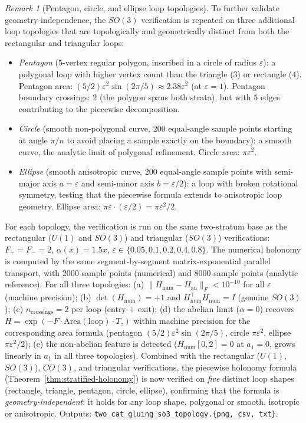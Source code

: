 \documentclass[11pt,a4paper]{article}
\theoremstyle{plain}
\theoremstyle{definition}
\theoremstyle{remark}
\newtheorem{remark}[theorem]{Remark}
\begin{document}
\begin{remark}[Pentagon, circle, and ellipse loop topologies]
\label{rem:2cat-gluing-so3-topology}
To further validate geometry-independence, the $SO(3)$
verification is repeated on three additional loop topologies that are topologically
and geometrically distinct from both the rectangular and triangular
loops:
\begin{itemize}[leftmargin=*, itemsep=2pt]
\item \emph{Pentagon} ($5$-vertex regular polygon, inscribed in a
circle of radius $\varepsilon$): a polygonal loop with higher vertex
count than the triangle ($3$) or rectangle ($4$). Pentagon area:
$(5/2) \varepsilon^2 \sin(2\pi/5) \approx 2.38 \varepsilon^2$ (at
$\varepsilon = 1$). Pentagon boundary crossings: $2$ (the polygon
spans both strata), but with $5$ edges contributing to the piecewise
decomposition.
\item \emph{Circle} (smooth non-polygonal curve, $200$ equal-angle
sample points starting at angle $\pi/n$ to avoid placing a sample
exactly on the boundary): a smooth curve, the analytic limit of
polygonal refinement. Circle area: $\pi \varepsilon^2$.
\item \emph{Ellipse} (smooth anisotropic curve, $200$ equal-angle
sample points with semi-major axis $a = \varepsilon$ and semi-minor
axis $b = \varepsilon/2$): a loop with broken rotational symmetry,
testing that the piecewise formula extends to anisotropic loop
geometry. Ellipse area: $\pi \varepsilon \cdot (\varepsilon/2) =
\pi\varepsilon^2/2$.
\end{itemize}
For each topology, the verification is run on the same two-stratum
base as the rectangular ($U(1)$ and $SO(3)$) and triangular ($SO(3)$)
verifications: $F_+ = F_- = 2$, $\alpha(x) = 1.5 x$, $\varepsilon
\in \{0.05, 0.1, 0.2, 0.4, 0.8\}$. The numerical holonomy is computed
by the same segment-by-segment matrix-exponential parallel transport,
with $2000$ sample points (numerical) and $8000$ sample points
(analytic reference). For all three topologies: (a)
$\|H_{\mathrm{num}} - H_{\mathrm{an}}\|_F < 10^{-10}$ for all
$\varepsilon$ (machine precision); (b) $\det(H_{\mathrm{num}}) = +1$
and $H_{\mathrm{num}}^\top H_{\mathrm{num}} = I$ (genuine $SO(3)$);
(c) $n_{\mathrm{crossings}} = 2$ per loop (entry + exit); (d) the
abelian limit ($\alpha = 0$) recovers $H = \exp(-F \cdot
\mathrm{Area}(\mathrm{loop}) \cdot T_z)$ within machine precision for
the corresponding area formula (pentagon $(5/2)\varepsilon^2
\sin(2\pi/5)$, circle $\pi\varepsilon^2$, ellipse $\pi\varepsilon^2
/2$); (e) the non-abelian feature is detected ($H_{\mathrm{num}}[0,2]
= 0$ at $a_1 = 0$, grows linearly in $a_1$ in all three topologies).
Combined with the rectangular ($U(1)$, $SO(3)$), $CO(3)$, and
triangular verifications, the piecewise holonomy formula
(Theorem~\ref{thm:stratified-holonomy}) is now verified on \emph{five}
distinct loop shapes (rectangle, triangle, pentagon, circle,
ellipse), confirming that the formula is \emph{geometry-independent}: it
holds for any loop shape, polygonal or smooth, isotropic or
anisotropic. Outputs:
\texttt{two\_cat\_gluing\_so3\_topology.\{png, csv, txt\}}.
\end{remark}
\end{document}
